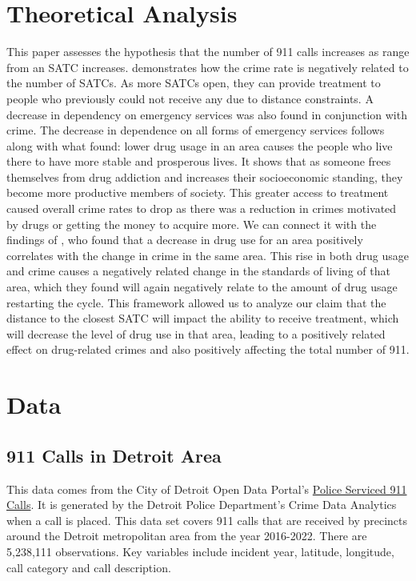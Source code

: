 \documentclass[12pt]{article}
\begin{document}
\section{Theoretical Analysis}
\label{sec:theory}
This paper assesses the hypothesis that the number of 911 calls increases as range from an SATC increases. \cite{SAT_centers_and_crime} demonstrates how the crime rate is negatively related to the number of SATCs. As more SATCs open, they can provide treatment to people who previously could not receive any due to distance constraints. A decrease in dependency on emergency services was also found in conjunction with crime. The decrease in dependence on all forms of emergency services follows along with what \cite{Socioeconomic-Determinants} found: lower drug usage in an area causes the people who live there to have more stable and prosperous lives. It shows that as someone frees themselves from drug addiction and increases their socioeconomic standing, they become more productive members of society. This greater access to treatment caused overall crime rates to drop as there was a reduction in crimes motivated by drugs or getting the money to acquire more. We can connect it with the findings of \cite{drugs_and_crime}, who found that a decrease in drug use for an area positively correlates with the change in crime in the same area. This rise in both drug usage and crime causes a negatively related change in the standards of living of that area, which they found will again negatively relate to the amount of drug usage restarting the cycle. This framework allowed us to analyze our claim that the distance to the closest SATC will impact the ability to receive treatment, which will decrease the level of drug use in that area, leading to a positively related effect on drug-related crimes and also positively affecting the total number of 911.



\section{Data}
\label{sec:data}

\subsection{911 Calls in Detroit Area}

This data comes from the City of Detroit Open Data Portal's   \href{https://data.detroitmi.gov/datasets/detroitmi::police-serviced-911-calls/about}{Police Serviced 911 Calls}. It is generated by the Detroit Police Department's Crime Data Analytics when a call is placed. This data set covers 911 calls that are received by precincts around the Detroit metropolitan area from the year 2016-2022. There are 5,238,111 observations. Key variables include incident year, latitude, longitude, call category and call description. 
\end{document}
